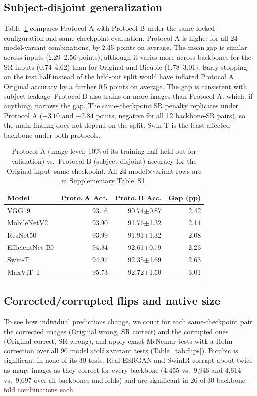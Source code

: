 \documentclass[conference]{IEEEtran}
\begin{document}
\subsection{Subject-disjoint generalization}
Table~\ref{tab:proto} compares Protocol A with Protocol B under the same locked configuration and same-checkpoint evaluation. Protocol A is higher for all 24 model-variant combinations, by 2.45 points on average. The mean gap is similar across inputs (2.29--2.56 points), although it varies more across backbones for the SR inputs (0.74--4.62) than for Original and Bicubic (1.78--3.01). Early-stopping on the test half instead of the held-out split would have inflated Protocol A Original accuracy by a further 0.5 points on average. The gap is consistent with subject leakage; Protocol B also trains on more images than Protocol A, which, if anything, narrows the gap. The same-checkpoint SR penalty replicates under Protocol A ($-3.10$ and $-2.84$ points, negative for all 12 backbone-SR pairs), so the main finding does not depend on the split. Swin-T is the least affected backbone under both protocols.

\begin{table}[t]
\centering
\caption{Protocol A (image-level; 10\% of its training half held out for validation) vs.\ Protocol B (subject-disjoint) accuracy for the Original input, same-checkpoint. All 24 model$\times$variant rows are in Supplementary Table~S1.}
\label{tab:proto}
\small
\begin{tabular}{@{}lrrr@{}}
\toprule
Model & Proto.\,A Acc. & Proto.\,B Acc. & Gap (pp) \\
\midrule
VGG19            & 93.16 & 90.74$\pm$0.87 & 2.42 \\
MobileNetV2      & 93.90 & 91.76$\pm$1.32 & 2.14 \\
ResNet50         & 93.99 & 91.91$\pm$1.32 & 2.08 \\
EfficientNet-B0  & 94.84 & 92.61$\pm$0.79 & 2.23 \\
Swin-T           & 94.97 & 92.35$\pm$1.69 & 2.63 \\
MaxViT-T         & 95.73 & 92.72$\pm$1.50 & 3.01 \\
\bottomrule
\end{tabular}
\end{table}

\subsection{Corrected/corrupted flips and native size}
To see how individual predictions change, we count for each same-checkpoint pair the corrected images (Original wrong, SR correct) and the corrupted ones (Original correct, SR wrong), and apply exact McNemar tests with a Holm correction over all 90 model$\times$fold$\times$variant tests (Table~\ref{tab:flips}). Bicubic is significant in none of its 30 tests. Real-ESRGAN and SwinIR corrupt about twice as many images as they correct for every backbone (4{,}455 vs.\ 9{,}946 and 4{,}614 vs.\ 9{,}697 over all backbones and folds) and are significant in 26 of 30 backbone-fold combinations each.
\end{document}
